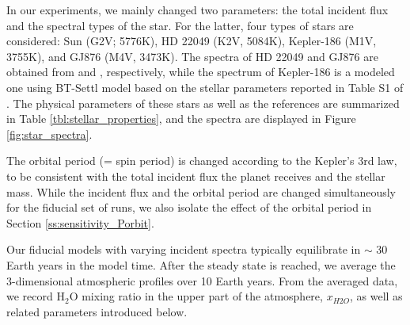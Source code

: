 \documentclass[11pt,numberedappendix,twocolappendix,]{emulateapj}
\def\water{H$_2$O }
\begin{document}
In our experiments, we mainly changed two parameters: the total incident flux and the spectral types of the star. 
For the latter, four types of stars are considered: 
Sun (G2V; 5776K), 
HD 22049 (K2V, 5084K), 
Kepler-186 (M1V, 3755K), and 
GJ876 (M4V, 3473K). 
The spectra of HD 22049 and GJ876 are obtained from \citet{Segura2003} and \citet{Domagal-Goldman2014}, respectively, 
while the spectrum of Kepler-186 is a modeled one using BT-Settl model \citep{Allard2012} based on the stellar parameters reported in Table S1 of \citet{Quintana2014}. 
The physical parameters of these stars as well as the references are summarized in Table \ref{tbl:stellar_properties}, and the spectra are displayed in Figure \ref{fig:star_spectra}. 

The orbital period (= spin period) is changed according to the Kepler's 3rd law, to be consistent with the total incident flux the planet receives and the stellar mass. While the incident flux and the orbital period are changed simultaneously for the fiducial set of runs, we also isolate the effect of the orbital period in Section \ref{ss:sensitivity_Porbit}. 

Our fiducial models with varying incident spectra typically equilibrate in  $\sim $ 30 Earth years in the model time. 
After the steady state is reached, we average the 3-dimensional atmospheric profiles over 10 Earth years. 
From the averaged data, we record \water mixing ratio in the upper part of the atmosphere, $x_{H2O}$, as well as related parameters introduced below. 
\end{document}

